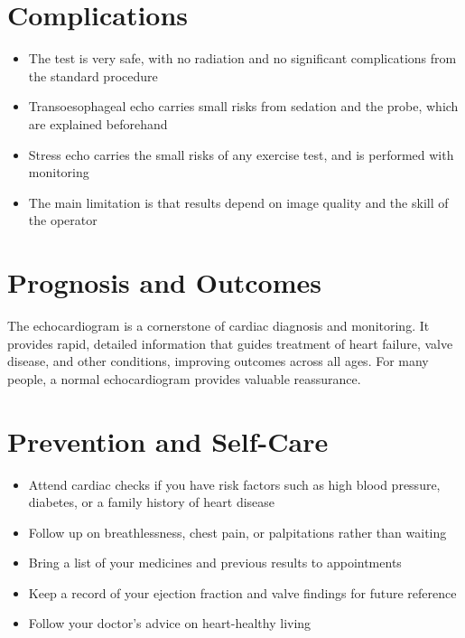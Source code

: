 \section*{Complications}
\begin{itemize}
    \item The test is very safe, with no radiation and no significant complications from the standard procedure
    \item Transoesophageal echo carries small risks from sedation and the probe, which are explained beforehand
    \item Stress echo carries the small risks of any exercise test, and is performed with monitoring
    \item The main limitation is that results depend on image quality and the skill of the operator
\end{itemize}

\section*{Prognosis and Outcomes}
The echocardiogram is a cornerstone of cardiac diagnosis and monitoring. It provides rapid, detailed information that guides treatment of heart failure, valve disease, and other conditions, improving outcomes across all ages. For many people, a normal echocardiogram provides valuable reassurance.

\section*{Prevention and Self-Care}
\begin{itemize}
    \item Attend cardiac checks if you have risk factors such as high blood pressure, diabetes, or a family history of heart disease
    \item Follow up on breathlessness, chest pain, or palpitations rather than waiting
    \item Bring a list of your medicines and previous results to appointments
    \item Keep a record of your ejection fraction and valve findings for future reference
    \item Follow your doctor's advice on heart-healthy living
\end{itemize}


